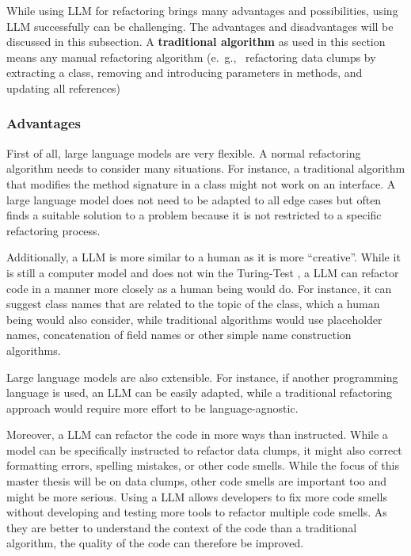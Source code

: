 While using  \ac{LLM} for refactoring brings many advantages  and possibilities, using \ac{LLM}  successfully can be challenging. The advantages and disadvantages will be discussed in this subsection. A \textbf{traditional algorithm} as used in this section means any manual refactoring algorithm (e.~g.,~ refactoring data clumps by extracting a class, removing and introducing parameters in methods, and updating all references)

\subsubsection{Advantages}

First of all, large language models are very flexible. A normal refactoring algorithm needs to consider many situations. For instance, a traditional algorithm that modifies the method signature in a class might not work on an interface. A large language model does not need to be adapted to all edge cases but often finds a suitable solution to a problem because it is not restricted to a specific refactoring process. \cite{shirafuji2023refactoring}

Additionally, a \ac{LLM} is more similar to a human as it is more  \enquote{creative}. While it is still a computer model and does not win the Turing-Test \cite{turing_test}, a \ac{LLM} can refactor code in a manner more closely as a human being would do. For instance, it can suggest class names that are related to the topic of the class, which a human being would also consider, while traditional algorithms would use placeholder names, concatenation of field names or other simple name construction algorithms. \cite{shirafuji2023refactoring}

Large language models are also extensible. For instance, if another programming language is used, an \ac{LLM} can be easily adapted, while a traditional refactoring approach would require more effort to be language-agnostic.

Moreover, a \ac{LLM} can refactor the code in more ways than instructed. While a model can be specifically instructed to refactor data clumps, it might also correct formatting errors, spelling mistakes, or other code smells. While the focus of this master thesis will be on data clumps, other code smells are important too and might be more serious. Using a  \ac{LLM} allows developers to fix more code smells without developing and testing more tools to refactor multiple code smells. As they are better to understand the context of the code than a traditional algorithm, the quality of the code can therefore be improved. \cite{shirafuji2023refactoring}


